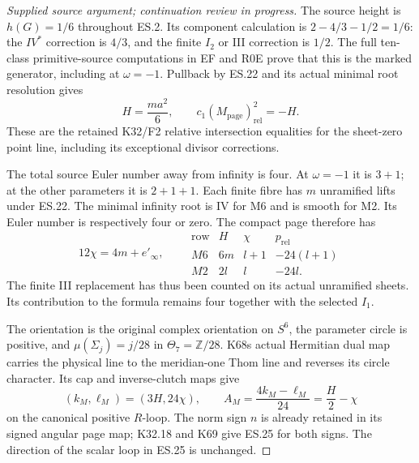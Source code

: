 \begin{proof}[Supplied source argument; continuation review in progress]
The source height is \(h(G)=1/6\) throughout ES.2. Its component
calculation is \(2-4/3-1/2=1/6\): the \(IV^*\) correction
is \(4/3\), and the finite \(I_2\) or III correction is \(1/2\).
The full ten-class primitive-source computations in EF and
R0E prove that this is the marked generator, including at
\(\omega=-1\). Pullback by ES.22 and its actual minimal root
resolution gives
\[
 H=\frac{ma^2}{6},\qquad
 c_1(M_{\mathrm{page}})_{\mathrm{rel}}^2=-H .
 \tag{ES.23}
\]
These are the retained K32/F2 relative intersection equalities
for the sheet-zero point line, including its exceptional
divisor corrections.

The total source Euler number away from infinity is four.
At \(\omega=-1\) it is \(3+1\); at the other parameters it
is \(2+1+1\). Each finite fibre has \(m\) unramified lifts
under ES.22. The minimal infinity root is IV for M6 and is
smooth for M2. Its Euler number is respectively four or zero.
The compact page therefore has
\[
 12\chi=4m+e'_\infty,\qquad
 \begin{array}{c|c|c|c}
 \text{row}&H&\chi&p_{\mathrm{rel}}\\ \hline
 M6&6m&l+1&-24(l+1)\\
 M2&2l&l&-24l .
 \end{array}
 \tag{ES.24}
\]
The finite III replacement has thus been counted on its actual
unramified sheets. Its contribution to the formula remains
four together with the selected \(I_1\).

The orientation is the original complex orientation on \(S^6\),
the parameter circle is positive, and
\(\mu(\Sigma_j)=j/28\) in \(\Theta_7=\mathbb Z/28\).
K68\textquotesingle s actual Hermitian dual map carries the physical line to
the meridian-one Thom line and reverses its circle character.
Its cap and inverse-clutch maps give
\[
 (k_M,\ell_M)=(3H,24\chi),\qquad
 A_M=\frac{4k_M-\ell_M}{24}=\frac H2-\chi
 \tag{ES.25}
\]
on the canonical positive \(R\)-loop. The norm sign \(n\)
is already retained in its signed angular page map; K32.18
and K69 give ES.25 for both signs. The direction of the
scalar loop in ES.25 is unchanged.


\end{proof}

